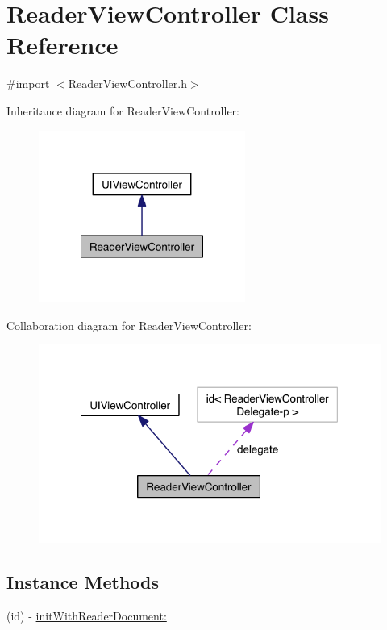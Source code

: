 \hypertarget{interface_reader_view_controller}{\section{Reader\-View\-Controller Class Reference}
\label{d5/dfd/interface_reader_view_controller}
}


{\ttfamily \#import $<$Reader\-View\-Controller.\-h$>$}



Inheritance diagram for Reader\-View\-Controller\-:
\nopagebreak
\begin{figure}[H]
\begin{center}
\leavevmode
\includegraphics[width=192pt]{d1/d3a/interface_reader_view_controller__inherit__graph}
\end{center}
\end{figure}


Collaboration diagram for Reader\-View\-Controller\-:
\nopagebreak
\begin{figure}[H]
\begin{center}
\leavevmode
\includegraphics[width=318pt]{d7/dee/interface_reader_view_controller__coll__graph}
\end{center}
\end{figure}
\subsection*{Instance Methods}
\begin{DoxyCompactItemize}
\item 
(id) -\/ \hyperlink{interface_reader_view_controller_ab5d4b891df22eba0bec1ee6f6be9ac29}{init\-With\-Reader\-Document\-:}
\end{DoxyCompactItemize}
